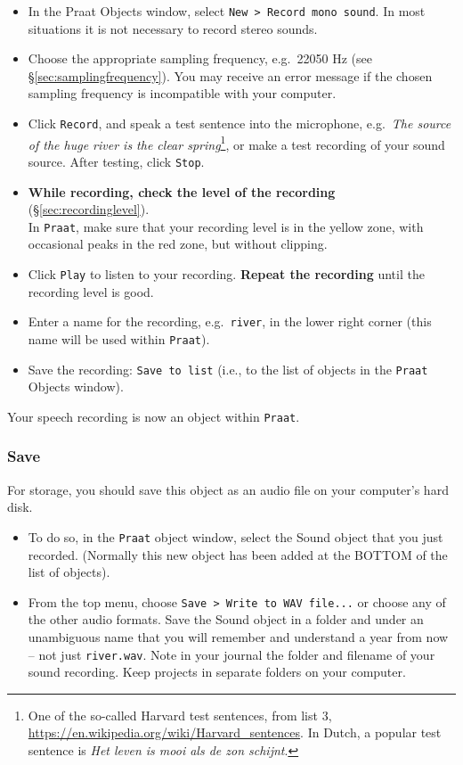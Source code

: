 \documentclass[
]{book}
\begin{document}
\begin{itemize}
\item
  In the Praat Objects window, select \texttt{New\ \textgreater{}\ Record\ mono\ sound}.
  In most situations it is not necessary to record stereo sounds.
\item
  Choose the appropriate sampling frequency, e.g.~22050 Hz (see §\ref{sec:samplingfrequency}). You may receive an error message if the chosen sampling frequency is incompatible with your computer.
\item
  Click \texttt{Record}, and speak a test sentence into the microphone, e.g.~\emph{The source of the huge river is the clear spring}\footnote{One of the so-called Harvard test sentences, from list 3, \url{https://en.wikipedia.org/wiki/Harvard_sentences}. In Dutch, a popular test sentence is \emph{Het leven is mooi als de zon schijnt}.}, or make a test recording of your sound source. After testing, click \texttt{Stop}.
\item
  \textbf{While recording, check the level of the recording} (§\ref{sec:recordinglevel}).\\
  In \texttt{Praat}, make sure that your recording level is in the yellow zone, with occasional peaks in the red zone, but without clipping.
\item
  Click \texttt{Play} to listen to your recording. \textbf{Repeat the recording} until the recording level is good.
\item
  Enter a name for the recording, e.g.~\texttt{river}, in the lower right corner (this name will be used within \texttt{Praat}).
\item
  Save the recording: \texttt{Save\ to\ list} (i.e., to the list of objects in the \texttt{Praat} Objects window).
\end{itemize}

Your speech recording is now an object within \texttt{Praat}.

\subsubsection{Save}\label{sec:praatsave}

For storage, you should save this object as an audio file on your computer's hard disk.

\begin{itemize}
\item
  To do so, in the \texttt{Praat} object window, select the Sound object that you just recorded. (Normally this new object has been added at the BOTTOM of the list of objects).
\item
  From the top menu, choose \texttt{Save\ \textgreater{}\ Write\ to\ WAV\ file...} or choose any of the other audio formats. Save the Sound object in a folder and under an unambiguous name that you will remember and understand a year from now -- not just \texttt{river.wav}. Note in your journal the folder and filename of your sound recording. Keep projects in separate folders on your computer.
\end{itemize}
\end{document}
